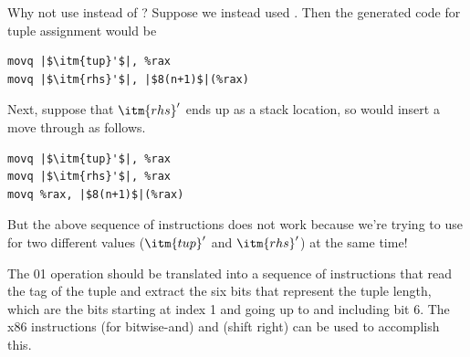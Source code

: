 \documentclass[7x10,nocrop]{TimesAPriori_MIT}%
\def\racketEd{0}
\def\pythonEd{1}
\def\edition{0}
\newcommand{\racket}[1]{{\if\edition\racketEd{#1}\fi}}
\newcommand{\python}[1]{{\if\edition\pythonEd #1\fi}}
\begin{document}
Why not use  instead of ? Suppose we instead used
. Then the generated code for tuple assignment would be
\begin{lstlisting}
movq |$\itm{tup}'$|, %rax
movq |$\itm{rhs}'$|, |$8(n+1)$|(%rax)
\end{lstlisting}
Next, suppose that $\itm{rhs}'$ ends up as a stack location, so
 would insert a move through 
as follows.
\begin{lstlisting}
movq |$\itm{tup}'$|, %rax
movq |$\itm{rhs}'$|, %rax
movq %rax, |$8(n+1)$|(%rax)
\end{lstlisting}
But the above sequence of instructions does not work because we're
trying to use  for two different values ($\itm{tup}'$ and
$\itm{rhs}'$) at the same time!

The \racket{}\python{} operation should
be translated into a sequence of instructions that read the tag of the
tuple and extract the six bits that represent the tuple length, which
are the bits starting at index 1 and going up to and including bit 6.
The x86 instructions  (for bitwise-and) and 
(shift right) can be used to accomplish this.
\end{document}
